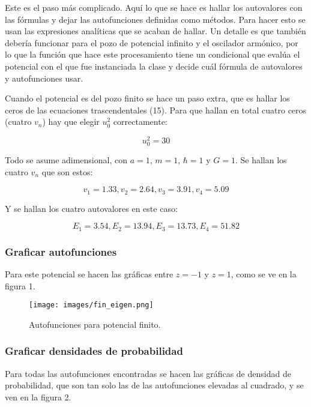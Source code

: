 \documentclass{article}
\begin{document}
Este es el paso más complicado. Aquí lo que se hace es hallar los autovalores con las fórmulas y dejar las autofunciones definidas como métodos. Para hacer esto se usan las expresiones analíticas que se acaban de hallar. Un detalle es que también debería funcionar para el pozo de potencial infinito y el oscilador armónico, por lo que la función que hace este procesamiento tiene un condicional que evalúa el potencial con el que fue instanciada la clase  y decide cuál fórmula de autovalores y autofunciones usar.

Cuando el potencial es del pozo finito se hace un paso extra, que es hallar los ceros de las ecuaciones trascendentales (15). Para que hallan en total cuatro ceros (cuatro $v_n$) hay que elegir $u_0^2$ correctamente:

\begin{equation}
    u_0^2=30
\end{equation}

Todo se asume adimensional, con $a=1$, $m=1$, $\hbar=1$ y $G=1$. Se hallan los cuatro $v_n$ que son estos:

\begin{equation}
    v_1=1.33, v_2=2.64, v_3=3.91, v_4=5.09
\end{equation}

Y se hallan los cuatro autovalores en este caso:

\begin{equation}
    E_1=3.54,E_2=13.94, E_3=13.73, E_4=51.82
\end{equation}

\subsubsection{Graficar autofunciones}

Para este potencial se hacen las gráficas entre $z=-1$ y $z=1$, como se ve en la figura 1.

\begin{figure}
    \texttt{[image: images/fin\_eigen.png]}
    \centering
    \caption{Autofunciones para potencial finito.}
\end{figure}

\subsubsection{Graficar densidades de probabilidad}

Para todas las autofunciones encontradas se hacen las gráficas de densidad de probabilidad, que son tan solo las de las autofunciones elevadas al cuadrado, y se ven en la figura 2.
\end{document}

